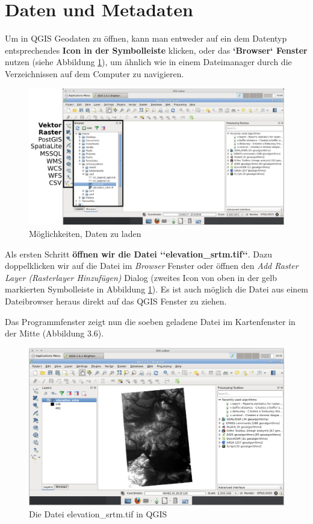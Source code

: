 \documentclass[a4paper,12pt,ngerman]{sphinxmanual}
\begin{document}
\section{Daten und Metadaten}
\label{uebung2:daten-und-metadaten}
Um in QGIS Geodaten zu öffnen, kann man entweder auf ein dem Datentyp entsprechendes \textbf{Icon in der Symbolleiste} klicken, oder das \textbf{{}`Browser{}` Fenster} nutzen (siehe Abbildung \hyperref[uebung2:figload]{ \ref*{uebung2:figload}}), um ähnlich wie in einem Dateimanager durch die Verzeichnissen auf dem Computer zu navigieren.
\begin{figure}[htbp]
\centering
\capstart

\includegraphics{qgis_data.png}
\caption{Möglichkeiten, Daten zu laden}\label{uebung2:figload}\end{figure}

Als ersten Schritt \textbf{öffnen wir die Datei {}`{}`elevation\_srtm.tif{}`{}`}. Dazu doppelklicken wir auf die Datei im \emph{Browser} Fenster oder öffnen den \emph{Add Raster Layer (Rasterlayer Hinzufügen)} Dialog (zweites Icon von oben in der gelb markierten Symbolleiste in Abbildung \hyperref[uebung2:figload]{ \ref*{uebung2:figload}}).
Es ist auch möglich die Datei aus einem Dateibrowser heraus direkt auf das QGIS Fenster zu ziehen.

Das Programmfenster zeigt nun die soeben geladene Datei im Kartenfenster in der Mitte (Abbildung 3.6).
\begin{figure}[htbp]
\centering
\capstart

\includegraphics{qgis_srtm.png}
\caption{Die Datei elevation\_srtm.tif in QGIS}\label{uebung2:figsrtm}\end{figure}
\end{document}
